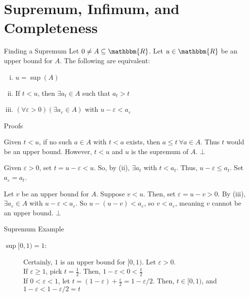 \documentclass[10pt]{extarticle}
\newcommand{\R}{\mathbbm{R}}
\begin{document}
  \section{Supremum, Infimum, and Completeness}%
  \begin{problem}{Finding a Supremum}
    Let $0\neq A\subseteq \R$. Let $u\in\R$ be an upper bound for $A$. The following are equivalent:
    \begin{enumerate}[(i)]
      \item $u=\sup(A)$
      \item If $t<u$, then $\exists a_t\in A$ such that $a_t > t$
      \item $(\forall \varepsilon > 0)(\exists a_{\varepsilon}\in A)$ with $u-\varepsilon < a_{\varepsilon}$
    \end{enumerate}
    \begin{problem}{Proofs}
      \begin{description}[font=\normalfont]
        \item[(i) $\Rightarrow$ (ii):] Given $t < u$, if no such $a\in A$ with $t < a$ exists, then $a \leq t~\forall a\in A$. Thus $t$ would be an upper bound. However, $t < u$ and $u$ is the supremum of $A$. $\bot$
        \item[(ii) $\Rightarrow$ (iii):] Given $\varepsilon > 0$, set $t = u-\varepsilon < u$. So, by (ii), $\exists a_t$ with $t < a_t$. Thus, $u-\varepsilon \leq a_t$. Set $a_{\varepsilon} = a_t$.
        \item[(iii) $\Rightarrow$ (i):] Let $v$ be an upper bound for $A$. Suppose $v < u$. Then, set $\varepsilon = u-v > 0$. By (iii), $\exists a_{\varepsilon}\in A$ with $u-\varepsilon < a_{\varepsilon}$. So $u-(u-v) < a_{\varepsilon}$, so $v < a_{\varepsilon}$, meaning $v$ cannot be an upper bound. $\bot$
      \end{description}
    \end{problem}
  \end{problem}
  \begin{problem}{Supremum Example}
    \begin{description}
      \item[$\sup [0,1) = 1$:] Certainly, $1$ is an upper bound for $[0,1)$. Let $\varepsilon > 0$.\\

        If $\varepsilon \geq 1$, pick $t = \frac{1}{2}$. Then, $1-\varepsilon < 0 < \frac{1}{2}$\\

        If $0 < \varepsilon < 1$, let $t = (1-\varepsilon) + \frac{\varepsilon}{2} = 1-\varepsilon/2$. Then, $t\in [0,1)$, and $1-\varepsilon < 1-\varepsilon/2 = t$
    \end{description}
  \end{problem}
\end{document}
